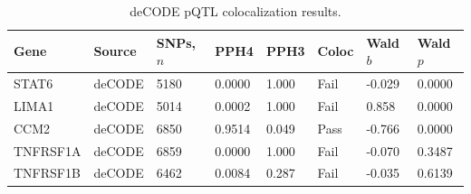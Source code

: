\begin{table}[htbp]
\centering
\caption{deCODE pQTL colocalization results.}\label{tab:decode_pqtl_coloc}
\small
\begin{tabular}{llllllll}
\toprule
  Gene & Source & SNPs, $n$ & PPH4 & PPH3 & Coloc & Wald $b$ & Wald $p$ \\
\midrule
  STAT6 & deCODE & 5180 & 0.0000 & 1.000 & Fail & -0.029 & 0.0000 \\
  LIMA1 & deCODE & 5014 & 0.0002 & 1.000 & Fail & 0.858 & 0.0000 \\
  CCM2 & deCODE & 6850 & 0.9514 & 0.049 & Pass & -0.766 & 0.0000 \\
  TNFRSF1A & deCODE & 6859 & 0.0000 & 1.000 & Fail & -0.070 & 0.3487 \\
  TNFRSF1B & deCODE & 6462 & 0.0084 & 0.287 & Fail & -0.035 & 0.6139 \\
\bottomrule
\end{tabular}

\end{table}
